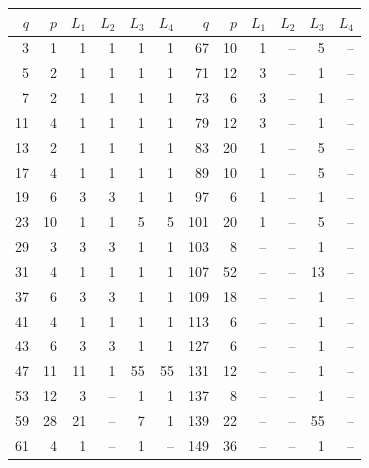 \begin{tabular}{rrrrrr@{\hspace{9mm}}rrrrrr}
\toprule
$q$ & $p$ & $L_1$ & $L_2$ & $L_3$ & $L_4$ & $q$ & $p$ & $L_1$ & $L_2$ & $L_3$ & $L_4$ \\
\midrule
3 & 1 & 1 & 1 & 1 & 1 & 67 & 10 & 1 & -- & 5 & -- \\
5 & 2 & 1 & 1 & 1 & 1 & 71 & 12 & 3 & -- & 1 & -- \\
7 & 2 & 1 & 1 & 1 & 1 & 73 & 6 & 3 & -- & 1 & -- \\
11 & 4 & 1 & 1 & 1 & 1 & 79 & 12 & 3 & -- & 1 & -- \\
13 & 2 & 1 & 1 & 1 & 1 & 83 & 20 & 1 & -- & 5 & -- \\
17 & 4 & 1 & 1 & 1 & 1 & 89 & 10 & 1 & -- & 5 & -- \\
19 & 6 & 3 & 3 & 1 & 1 & 97 & 6 & 1 & -- & 1 & -- \\
23 & 10 & 1 & 1 & 5 & 5 & 101 & 20 & 1 & -- & 5 & -- \\
29 & 3 & 3 & 3 & 1 & 1 & 103 & 8 & -- & -- & 1 & -- \\
31 & 4 & 1 & 1 & 1 & 1 & 107 & 52 & -- & -- & 13 & -- \\
37 & 6 & 3 & 3 & 1 & 1 & 109 & 18 & -- & -- & 1 & -- \\
41 & 4 & 1 & 1 & 1 & 1 & 113 & 6 & -- & -- & 1 & -- \\
43 & 6 & 3 & 3 & 1 & 1 & 127 & 6 & -- & -- & 1 & -- \\
47 & 11 & 11 & 1 & 55 & 55 & 131 & 12 & -- & -- & 1 & -- \\
53 & 12 & 3 & -- & 1 & 1 & 137 & 8 & -- & -- & 1 & -- \\
59 & 28 & 21 & -- & 7 & 1 & 139 & 22 & -- & -- & 55 & -- \\
61 & 4 & 1 & -- & 1 & -- & 149 & 36 & -- & -- & 1 & -- \\
\bottomrule
\end{tabular}
